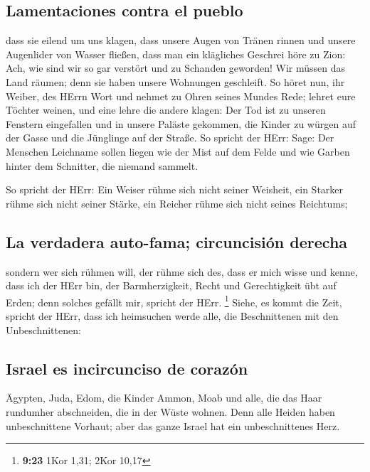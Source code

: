 \hypertarget{lamentaciones-contra-el-pueblo}{%
\subsection{Lamentaciones contra el
pueblo}\label{lamentaciones-contra-el-pueblo}}

 dass sie eilend um uns klagen, dass unsere Augen von
Tränen rinnen und unsere Augenlider von Wasser fließen, 
dass man ein klägliches Geschrei höre zu Zion: Ach, wie sind wir so gar
verstört und zu Schanden geworden! Wir müssen das Land räumen; denn sie
haben unsere Wohnungen geschleift.  So höret nun, ihr
Weiber, des HErrn Wort und nehmet zu Ohren seines Mundes Rede; lehret
eure Töchter weinen, und eine lehre die andere klagen: 
Der Tod ist zu unseren Fenstern eingefallen und in unsere Paläste
gekommen, die Kinder zu würgen auf der Gasse und die Jünglinge auf der
Straße.  So spricht der HErr: Sage: Der Menschen
Leichname sollen liegen wie der Mist auf dem Felde und wie Garben hinter
dem Schnitter, die niemand sammelt.

 So spricht der HErr: Ein Weiser rühme sich nicht seiner
Weisheit, ein Starker rühme sich nicht seiner Stärke, ein Reicher rühme
sich nicht seines Reichtums;

\hypertarget{la-verdadera-auto-fama-circuncisiuxf3n-derecha}{%
\subsection{La verdadera auto-fama; circuncisión
derecha}\label{la-verdadera-auto-fama-circuncisiuxf3n-derecha}}

 sondern wer sich rühmen will, der rühme sich des, dass
er mich wisse und kenne, dass ich der HErr bin, der Barmherzigkeit,
Recht und Gerechtigkeit übt auf Erden; denn solches gefällt mir, spricht
der HErr. \footnote{\textbf{9:23} 1Kor 1,31; 2Kor 10,17} 
Siehe, es kommt die Zeit, spricht der HErr, dass ich heimsuchen werde
alle, die Beschnittenen mit den Unbeschnittenen:

\hypertarget{israel-es-incircunciso-de-corazuxf3n}{%
\subsection{Israel es incircunciso de
corazón}\label{israel-es-incircunciso-de-corazuxf3n}}

 Ägypten, Juda, Edom, die Kinder Ammon, Moab und alle,
die das Haar rundumher abschneiden, die in der Wüste wohnen. Denn alle
Heiden haben unbeschnittene Vorhaut; aber das ganze Israel hat ein
unbeschnittenes Herz.

